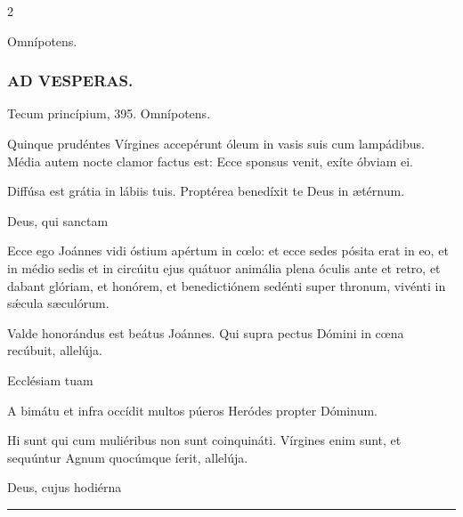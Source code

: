 \documentclass[9pt,twoside]{extarticle}
\begin{document}
\begin{multicols}{2}
\begin{tightlist}{}
\item {} Omnípotens.
\end{tightlist}

\subsubsection*{\center \textsc{AD VESPERAS.}}
\begin{tightlist}{}
\item {} Tecum princípium,  395.  Omnípotens.
\item {} Quinque prudéntes Vírgines accepérunt óleum in vasis suis cum lampádibus. Média autem nocte clamor factus est: Ecce sponsus venit, exíte óbviam ei.
\item {} Diffúsa est grátia in lábiis tuis.  Proptérea benedíxit te Deus in ætérnum.
\item {} Deus, qui sanctam 
\item {} Ecce ego Joánnes vidi óstium apértum in cœlo: et ecce sedes pósita erat in eo, et in médio sedis et in circúitu ejus quátuor animália plena óculis ante et retro, et dabant glóriam, et honórem, et benedictiónem sedénti super thronum, vivénti in sǽcula sæculórum.
\item {} Valde honorándus est beátus Joánnes.  Qui supra pectus Dómini in cœna recúbuit, allelúja.
\item {} Ecclésiam tuam 
\item {} A bimátu et infra occídit multos púeros Heródes propter Dóminum.
\item {} Hi sunt qui cum muliéribus non sunt coinquináti.  Vírgines enim sunt, et sequúntur Agnum quocúmque íerit, allelúja.
\item {} Deus, cujus hodiérna 
\end{tightlist}

\begin{center}\textcolor{red}{\rule{\linewidth}{0.5pt}} \end{center}

\subsection*{\center {}}

\end{multicols}
\end{document}
